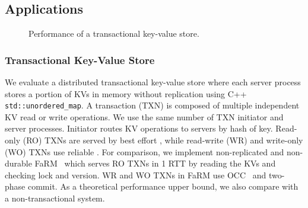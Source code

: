 \subsection{Applications}
\label{sec:application}


\begin{figure}[t]
	\centering
	\hspace{0.01\textwidth}
	\hspace{0.01\textwidth}
	\vspace{-10pt}
	\caption{Performance of a transactional key-value store.}
	\vspace{-10pt}
\end{figure}


\subsubsection{Transactional Key-Value Store}
\label{subsec:eval-kvs}


We evaluate a distributed transactional key-value store where each server process stores a portion of KVs in memory without replication using C++ \texttt{std::unordered\_map}.
A transaction (TXN) is composed of multiple independent KV read or write operations.
We use the same number of TXN initiator and server processes.
Initiator routes KV operations to servers by hash of key.
Read-only (RO) TXNs are served by best effort \sys{}, while read-write (WR) and write-only (WO) TXNs use reliable \sys{}.
For comparison, we implement non-replicated and non-durable FaRM~\cite{dragojevic2014farm} which serves RO TXNs in 1 RTT by reading the KVs and checking lock and version. WR and WO TXNs in FaRM use OCC~\cite{kung1981optimistic} and two-phase commit.
As a theoretical performance upper bound, we also compare with a non-transactional system.

